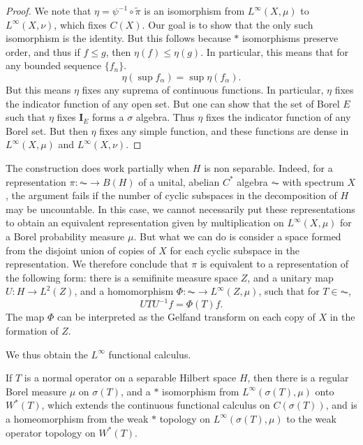 \begin{proof}
    We note that $\eta = \psi^{-1} \circ \tilde{\pi}$ is an isomorphism from $L^\infty(X,\mu)$ to $L^\infty(X,\nu)$, which fixes $C(X)$. Our goal is to show that the only such isomorphism is the identity. But this follows because $*$ isomorphisms preserve order, and thus if $f \leq g$, then $\eta(f) \leq \eta(g)$. In particular, this means that for any bounded sequence $\{ f_n \}$.
    \[ \eta( \sup f_\alpha ) = \sup \eta(f_\alpha). \]
    But this means $\eta$ fixes any suprema of continuous functions. In particular, $\eta$ fixes the indicator function of any open set. But one can show that the set of Borel $E$ such that $\eta$ fixes $\mathbf{I}_E$ forms a $\sigma$ algebra. Thus $\eta$ fixes the indicator function of any Borel set. But then $\eta$ fixes any simple function, and these functions are dense in $L^\infty(X,\mu)$ and $L^\infty(X,\nu)$.
\end{proof}

\begin{remark}
    The construction does work partially when $H$ is non separable. Indeed, for a representation $\pi: \AC \to B(H)$ of a unital, abelian $C^*$ algebra $\AC$ with spectrum $X$, the argument fails if the number of cyclic subspaces in the decomposition of $H$ may be uncountable. In this case, we cannot necessarily put these representations to obtain an equivalent representation given by multiplication on $L^\infty(X,\mu)$ for a Borel probability measure $\mu$. But what we can do is consider a space formed from the disjoint union of copies of $X$ for each cyclic subspace in the representation. We therefore conclude that $\pi$ is equivalent to a representation of the following form: there is a semifinite measure space $Z$, and a unitary map $U: H \to L^2(Z)$, and a homomorphism $\Phi: \AC \to L^\infty(Z,\mu)$, such that for $T \in \AC$,
    \[ UTU^{-1} f = \Phi(T) f. \]
    The map $\Phi$ can be interpreted as the Gelfand transform on each copy of $X$ in the formation of $Z$.
\end{remark}

We thus obtain the $L^\infty$ functional calculus.

\begin{theorem}
    If $T$ is a normal operator on a separable Hilbert space $H$, then there is a regular Borel measure $\mu$ on $\sigma(T)$, and a $*$ isomorphism from $L^\infty(\sigma(T),\mu)$ onto $W^*(T)$, which extends the continuous functional calculus on $C(\sigma(T))$, and is a homeomorphism from the weak $*$ topology on $L^\infty(\sigma(T),\mu)$ to the weak operator topology on $W^*(T)$.
\end{theorem}

